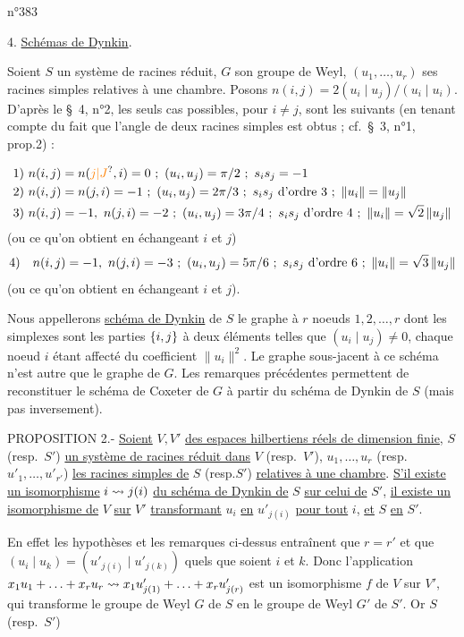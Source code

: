 \hfill n°383

4. \uline{Schémas de Dynkin}.

Soient $S$ un système de racines réduit, $G$ son groupe de Weyl, $(u_1,\ldots,u_r)$ ses racines simples relatives à une chambre. Posons $n(i,j)=2(u_i\mid u_j)/(u_i\mid u_i)$. D'après le \S~4, n°2, les seuls cas possibles, pour $i\ne j$, sont les suivants (en tenant compte du fait que l'angle de deux racines simples est obtus ; cf.\ \S~3, n°1, prop.2) :

\[
\begin{aligned}
1)\ & n(i,j)=n(\unsure{j|J},i)=0\ ;\ (u_i,u_j)=\handwritten{\pi}/2\ ;\ s_i s_j=-1\\
2)\ & n(i,j)=n(j,i)=-1\ ;\ (u_i,u_j)=2\handwritten{\pi}/3\ ;\ s_i s_j\ \text{d'ordre }3\ ;\ \|u_i\|=\|u_j\|\\
3)\ & n(i,j)=-1,\ n(j,i)=-2\ ;\ (u_i,u_j)=3\handwritten{\pi}/4\ ;\ s_i s_j\ \text{d'ordre }4\ ;\ \|u_i\|=\handwritten{\sqrt{2}}\,\|u_j\|
\end{aligned}
\]
(ou ce qu'on obtient en échangeant $i$ et $j$)
\[
4)\quad n(i,j)=-1,\ n(j,i)=-3\ ;\ (u_i,u_j)=5\handwritten{\pi}/6\ ;\ s_i s_j\ \text{d'ordre }6\ ;\ \|u_i\|=\handwritten{\sqrt{3}}\,\|u_j\|
\]
(ou ce qu'on obtient en échangeant $i$ et $j$).

Nous appellerons \uline{schéma de Dynkin} de $S$ le graphe à $r$ noeuds $1,2,\ldots,r$ dont les simplexes sont les parties $\{i,j\}$ à deux éléments telles que $(u_i\mid u_j)\ne0$, chaque noeud $i$ étant affecté du coefficient $\|u_i\|^2$. Le graphe sous-jacent à ce schéma n'est autre que le graphe de $G$. Les remarques précédentes permettent de reconstituer le schéma de Coxeter de $G$ à partir du schéma de Dynkin de $S$ (mais pas inversement).

PROPOSITION 2.- \uline{Soient} $V,V'$ \uline{des espaces hilbertiens réels de dimension finie}, $S$ (resp.\ $S'$) \uline{un système de racines réduit dans} $V$ (resp.\ $V'$), $u_1,\ldots,u_r$ (resp.\ $u'_1,\ldots,u'_{r'}$) \uline{les racines simples de} $S$ (resp.$S'$) \uline{relatives à une chambre}. \uline{S'il existe un isomorphisme} $i\rightsquigarrow j(i)$ \uline{du schéma de Dynkin de} $S$ \uline{sur celui de} $S'$, \uline{il existe un isomorphisme de} $V$ \uline{sur} $V'$ \uline{transformant} $u_i$ \uline{en} $u'_{j(i)}$ \uline{pour tout} $i$, \uline{et} $S$ \uline{en} $S'$.

En effet les hypothèses et les remarques ci-dessus entraînent que $r=r'$ et que $(u_i\mid u_k)=(u'_{j(i)}\mid u'_{j(k)})$ quels que soient $i$ et $k$. Donc l'application $x_1u_1+\ldots+x_ru_r\rightsquigarrow x_1u'_{j(1)}+\ldots+x_ru'_{j(r)}$ est un isomorphisme $f$ de $V$ sur $V'$, qui transforme le groupe de Weyl $G$ de $S$ en le groupe de Weyl $G'$ de $S'$. Or $S$ (resp.\ $S'$)

